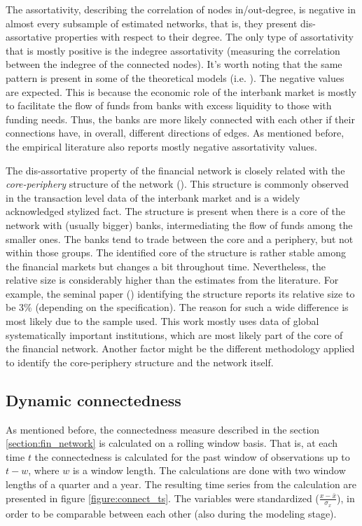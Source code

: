 \documentclass[12pt]{article}
\begin{document}
The assortativity, describing the correlation of nodes in/out-degree, is negative in almost every subsample of estimated networks, that is, they present dis-assortative properties with respect to their degree. The only type of assortativity that is mostly positive is the indegree assortativity (measuring the correlation between the indegree of the connected nodes). It's worth noting that the same pattern is present in some of the theoretical models (i.e. \cite{aldasoro17}). The negative values are expected. This is because the economic role of the interbank market is mostly to facilitate the flow of funds from banks with excess liquidity to those with funding needs. Thus, the banks are more likely connected with each other if their connections have, in overall, different directions of edges. As mentioned before, the empirical literature also reports mostly negative assortativity values.

The dis-assortative property of the financial network is closely related with the \textit{core-periphery} structure of the network (\cite{craig14}). This structure is commonly observed in the transaction level data of the interbank market and is a widely acknowledged stylized fact. The structure is present when there is a core of the network with (usually bigger) banks, intermediating the flow of funds among the smaller ones. The banks tend to trade between the core and a periphery, but not within those groups. The identified core of the structure is rather stable among the financial markets but changes a bit throughout time. Nevertheless, the relative size is considerably higher than the estimates from the literature. For example, the seminal paper (\cite{craig14}) identifying the structure reports its relative size to be 3\% (depending on the specification). The reason for such a wide difference is most likely due to the sample used. This work mostly uses data of global systematically important institutions, which are most likely part of the core of the financial network. Another factor might be the different methodology applied to identify the core-periphery structure and the network itself. 

\subsection{Dynamic connectedness}

As mentioned before, the connectedness measure described in the section \ref{section:fin_network} is calculated on a rolling window basis. That is, at each time $t$ the connectedness is calculated for the past window of observations up to $t - w$, where $w$ is a window length. The calculations are done with two window lengths of a quarter and a year. The resulting time series from the calculation are presented in figure \ref{figure:connect_ts}. The variables were standardized ($\frac{x - \bar{x}}{\sigma_{x}}$), in order to be comparable between each other (also during the modeling stage).
\end{document}
